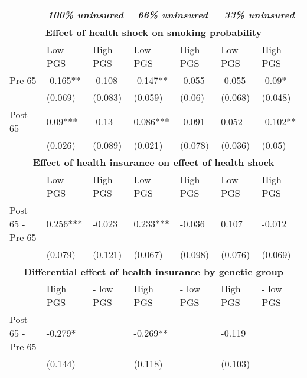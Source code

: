 % 
\begin{tabular}{ l | p{2cm}p{2cm}| p{2cm}p{2cm}| p{2cm}p{2cm}}
  & \multicolumn{2}{c}{ \textit{100\% uninsured}} & \multicolumn{2}{c}{ \textit{66\% uninsured}} & \multicolumn{2}{c}{ \textit{33\% uninsured}} \\
 \toprule
  \multicolumn{7}{c}{ \textbf{Effect of health shock on smoking probability}} \\
 \midrule
 & Low PGS & High PGS & Low PGS & High PGS & Low PGS & High PGS \\ 
   \midrule
Pre 65 & -0.165** & -0.108 & -0.147** & -0.055 & -0.055 & -0.09* \\ 
   & (0.069) & (0.083) & (0.059) & (0.06) & (0.068) & (0.048) \\ 
  Post 65 & 0.09*** & -0.13 & 0.086*** & -0.091 & 0.052 & -0.102** \\ 
   & (0.026) & (0.089) & (0.021) & (0.078) & (0.036) & (0.05) \\ 
   \toprule \multicolumn{7}{c}{ \textbf{Effect of health insurance on effect of health shock}} \\
 \midrule
 & Low PGS & High PGS & Low PGS & High PGS & Low PGS & High PGS \\ 
   \midrule
Post 65 - Pre 65 & 0.256*** & -0.023 & 0.233*** & -0.036 & 0.107 & -0.012 \\ 
   & (0.079) & (0.121) & (0.067) & (0.098) & (0.076) & (0.069) \\ 
   \toprule \multicolumn{7}{c}{ \textbf{Differential effect of health insurance by genetic group}} \\
 \midrule
 & High PGS  & - low PGS & High PGS  & - low PGS & High PGS  & - low PGS \\ 
   \midrule
Post 65 - Pre 65 & -0.279* &  & -0.269** &  & -0.119 &  \\ 
   & (0.144) &  & (0.118) &  & (0.103) &  \\ 
  \end{tabular}
